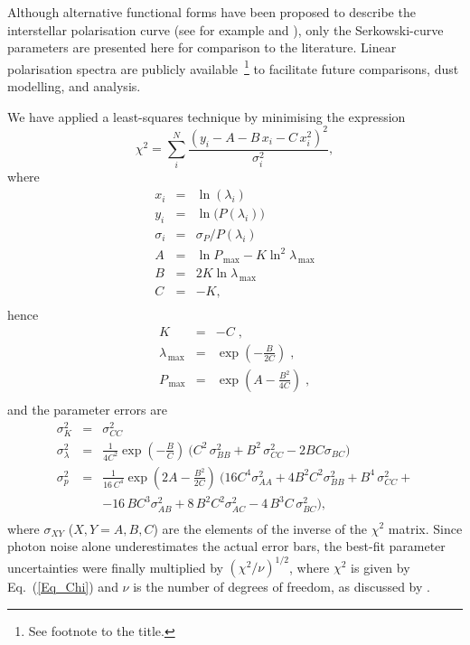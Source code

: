 \documentclass[a4paper]{aa}
\newcommand{\pl}{\ensuremath{P}}
\newcommand{\lmax}{\ensuremath{\lambda_\mathrm{\,max}}}
\newcommand{\pmax}{\ensuremath{P_\mathrm{\,max}}}
\begin{document}
Although alternative functional forms have been
proposed to describe the interstellar polarisation curve (see for example
\citeauthor{WolSmi84} \citeyear{WolSmi84} and
\citeauthor{Efimov09} \citeyear{Efimov09}),
only the Serkowski-curve parameters
are presented here for comparison to the literature.  Linear
polarisation spectra are publicly available~\footnote{See footnote to the title.} to
facilitate future comparisons, dust modelling, and analysis.

We have applied a least-squares technique by
minimising the expression
\begin{equation}
  \chi^2 = \sum_i^{N}
  \frac{\left(y_i - A - B\,x_i - C\,x_i^2\right)^2}{\sigma^2_i}
\label{Eq_Chi}
,\end{equation}
where
\[
\begin{array}{rcl}
x_i &=& \ln(\lambda_i)\\
y_i &=& \ln\big(\pl(\lambda_i)\big) \\
\sigma_i &=& \sigma_{\pl}/\pl(\lambda_i)\\
A &=& \ln \pmax - K \ln^2 \lmax \\
B &=& 2 K \ln \lmax\\
C &=& -K,\\
\end{array}
\]
hence
\[
\begin{array}{rcl}
K &=& -C\; ,\\
\lmax &=& \exp\left(-\frac{B}{2C}\right)\; ,\\
\pmax &=& \exp\left(A - \frac{B^2}{4C}\right)\; ,\\
\end{array}
\]
and the parameter errors are
\[
\begin{array}{rcl}
    \sigma^2_K &=& \sigma^2_{CC} \\[2mm]
\sigma^2_\lambda &=& \frac{1}{4C^2}\exp\left(-\frac{B}{C}\right)\
                   \big(C^2\,\sigma^2_{BB} + B^2\,\sigma^2_{CC} -
                   2BC\sigma_{BC} \big) \\[2mm]
   \sigma^2_{p} &=& \frac{1}{16\,C^4}\exp\left(2A-\frac{B^2}{2C}\right)\
                   \Big(16 C^4 \sigma^2_{AA} + 4B^2C^2 \sigma^2_{BB} +B^4\, \sigma^2_{CC} + \\
               & & - 16\,BC^3 \sigma^2_{AB} + 8\,B^2C^2 \sigma^2_{AC} -
                   4\,B^3C\, \sigma^2_{BC} \Big), \\
\end{array}
\]
where $\sigma_{XY}$ ($X,Y=A,B,C$) are the elements of the inverse of
the $\chi^2$ matrix. Since photon noise alone underestimates the
actual error bars, the best-fit parameter uncertainties
were finally multiplied by $(\chi^2/\nu)^{1/2}$, where $\chi^2$ is
given by Eq.~(\ref{Eq_Chi}) and $\nu$ is the number of degrees of
freedom, as discussed by \citep{Bagetal12}.
\end{document}
